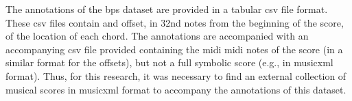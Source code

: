 

The annotations of the \gls{bps} dataset are provided in a
tabular \gls{csv} file format. These \gls{csv} files contain
and offset, in 32nd notes from the beginning of the score,
of the location of each chord. The annotations are
accompanied with an accompanying \gls{csv} file provided
containing the midi \gls{midi} notes of the score (in a
similar format for the offsets), but not a full symbolic
score (e.g., in \gls{musicxml} format). Thus, for this
research, it was necessary to find an external collection of
musical scores in \gls{musicxml} format to accompany the
annotations of this dataset.